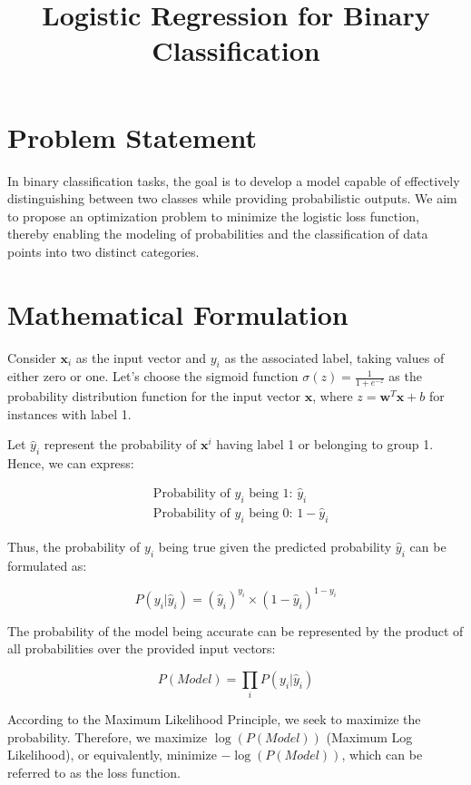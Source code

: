 \documentclass{article}
\begin{document}
\title{Logistic Regression for Binary Classification}
\author{}
\date{}
\maketitle

\section*{Problem Statement}

In binary classification tasks, the goal is to develop a model capable of effectively distinguishing between two classes while providing probabilistic outputs. We aim to propose an optimization problem to minimize the logistic loss function, thereby enabling the modeling of probabilities and the classification of data points into two distinct categories.

\section*{Mathematical Formulation}

Consider \( \mathbf{x}_i \) as the input vector and \( y_i \) as the associated label, taking values of either zero or one. Let's choose the sigmoid function \( \sigma(z) = \frac{1}{1+e^{-z}} \) as the probability distribution function for the input vector \( \mathbf{x} \), where \( z = \mathbf{w}^T \mathbf{x} + b \) for instances with label 1.

Let \( \hat{y}_i \) represent the probability of \( \mathbf{x}^i \) having label 1 or belonging to group 1. Hence, we can express:

\begin{align*}
&\text{Probability of } y_i \text{ being 1: } \hat{y}_i \\
&\text{Probability of } y_i \text{ being 0: } 1 - \hat{y}_i
\end{align*}

Thus, the probability of \( y_i \) being true given the predicted probability \( \hat{y}_i \) can be formulated as:

\[ P(y_i | \hat{y}_i) = (\hat{y}_i)^{y_i} \times (1 - \hat{y}_i)^{1 - y_i} \]

The probability of the model being accurate can be represented by the product of all probabilities over the provided input vectors:

\[ P(Model) = \prod_{i} P(y_i | \hat{y}_i) \]

According to the Maximum Likelihood Principle, we seek to maximize the probability. Therefore, we maximize \( \log(P(Model)) \) (Maximum Log Likelihood), or equivalently, minimize \( -\log(P(Model)) \), which can be referred to as the loss function.
\end{document}
